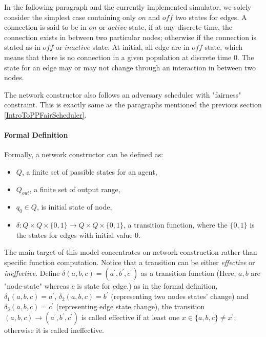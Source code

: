 \par\noindent

In the following paragraph and the currently implemented simulator, we solely consider the simplest
case containing only $on$ and $off$ two states for edges. A connection is said to be in
$on$ or $active$ state, if at any discrete time, the connection exists in between two
particular nodes; otherwise if the connection is stated as in $off$ or $inactive$ state.
At initial, all edge are in $off$ state, which means that there is no connection in a given
population at discrete time 0. The state for an edge may or may not change through an interaction
in between two nodes.

\par\noindent
The network constructor also follows an adversary scheduler with "fairness" constraint. This is
exactly same as the paragraphs mentioned the previous section \ref{IntroToPPFairScheduler}.

\paragraph{Formal Definition}
Formally, a network constructor can be defined as:
\begin{itemize}
  \item $Q$, a finite set of passible states for an agent,
  \item $Q_{out}$, a finite set of output range,
  \item $q_{0} \in Q $, is initial state of node,
  \item $\delta: Q \times Q \times \{0,1\} \to Q \times Q \times \{0,1\}$, a transition function, where the $\{0,1\}$ is the states for edges with initial value 0.
\end{itemize}

\par\noindent
The main target of this model concentrates on network construction rather than
specific function computation. Notice that a transition can be either \textit{effective}
or \textit{ineffective}. Define $\delta(a, b, c) = (a^{'}, b^{'},c^{'})$ as a transition function (Here, $a, b$ are "node-state" whereas $c$ is state for edge.)
as in the formal definition, $\delta_{1}(a,b,c) = a^{'}$, $\delta_{2}(a,b,c) = b^{'}$ (representing two nodes states' change)
and $\delta_{3}(a,b,c) = c^{'}$ (representing edge state change), the transition $(a,b,c) \to (a^{'}, b^{'},c^{'})$ is called
effective if at least one $x \in \{a,b,c\} \not= x^{'} $; otherwise it is called ineffective.

